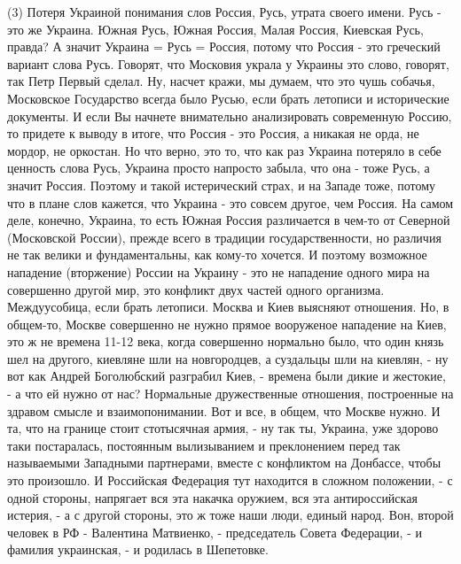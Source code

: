 (3) Потеря Украиной понимания слов Россия, Русь, утрата своего имени. Русь -
это же Украина. Южная Русь, Южная Россия, Малая Россия, Киевская Русь, правда?
А значит Украина = Русь = Россия, потому что Россия - это греческий вариант
слова Русь. Говорят, что Московия украла у Украины это слово, говорят, так Петр
Первый сделал. Ну, насчет кражи, мы думаем, что это чушь собачья, Московское
Государство всегда было Русью, если брать летописи и исторические документы. И
если Вы начнете внимательно анализировать современную Россию, то придете к
выводу в итоге, что Россия - это Россия, а никакая не орда, не мордор, не
оркостан. Но что верно, это то, что как раз Украина потеряло в себе ценность
слова Русь, Украина просто напросто забыла, что она - тоже Русь, а значит
Россия. Поэтому и такой истерический страх, и на Западе тоже, потому что в
плане слов кажется, что Украина - это совсем другое, чем Россия. На самом деле,
конечно, Украина, то есть Южная Россия различается в чем-то от Северной
(Московской России), прежде всего в традиции государственности, но различия не
так велики и фундаментальны, как кому-то хочется. И поэтому возможное нападение
(вторжение) России на Украину - это не нападение одного мира на совершенно
другой мир, это конфликт двух частей одного организма.  Междуусобица, если
брать летописи.  Москва и Киев выясняют отношения. Но, в общем-то, Москве
совершенно не нужно прямое вооруженое нападение на Киев, это ж не времена 11-12
века, когда совершенно нормально было, что один князь шел на другого, киевляне
шли на новгородцев, а суздальцы шли на киевлян, - ну вот как Андрей Боголюбский
разграбил Киев, - времена были дикие и жестокие, - а что ей нужно от нас?
Нормальные дружественные отношения, построенные на здравом смысле и
взаимопонимании. Вот и все, в общем, что Москве нужно. И та, что на границе
стоит стотысячная армия, - ну так ты, Украина, уже здорово таки постаралась,
постоянным вылизыванием и преклонением перед так называемыми Западными
партнерами, вместе с конфликтом на Донбассе, чтобы это произошло. И Российская Федерация
тут находится в сложном положении, - с одной стороны, напрягает вся эта накачка оружием, 
вся эта антироссийская истерия, - а с другой стороны, это ж тоже наши люди, единый народ. Вон, 
второй человек в РФ - Валентина Матвиенко, - председатель Совета Федерации, - и фамилия украинская, - 
и родилась в Шепетовке. 
